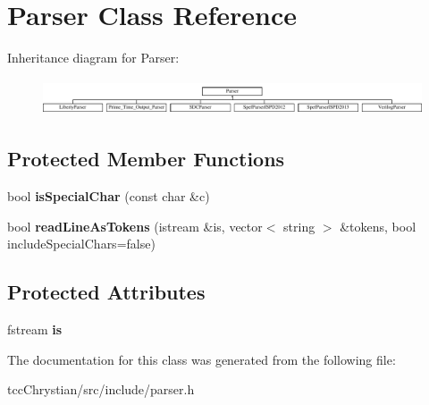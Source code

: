 \hypertarget{classParser}{\section{Parser Class Reference}
\label{classParser}
}
Inheritance diagram for Parser\-:\begin{figure}[H]
\begin{center}
\leavevmode
\includegraphics[height=1.072797cm]{classParser}
\end{center}
\end{figure}
\subsection*{Protected Member Functions}
\begin{DoxyCompactItemize}
\item 
\hypertarget{classParser_a83c7ac58f2c98cc54e9c750b29e6b0f0}{bool {\bfseries is\-Special\-Char} (const char \&c)}\label{classParser_a83c7ac58f2c98cc54e9c750b29e6b0f0}

\item 
\hypertarget{classParser_ae42067f51acd49ccccb0b0373321a421}{bool {\bfseries read\-Line\-As\-Tokens} (istream \&is, vector$<$ string $>$ \&tokens, bool include\-Special\-Chars=false)}\label{classParser_ae42067f51acd49ccccb0b0373321a421}

\end{DoxyCompactItemize}
\subsection*{Protected Attributes}
\begin{DoxyCompactItemize}
\item 
\hypertarget{classParser_a74c323dd4798b459fa982295b8e871bc}{fstream {\bfseries is}}\label{classParser_a74c323dd4798b459fa982295b8e871bc}

\end{DoxyCompactItemize}


The documentation for this class was generated from the following file\-:\begin{DoxyCompactItemize}
\item 
tcc\-Chrystian/src/include/parser.\-h\end{DoxyCompactItemize}

